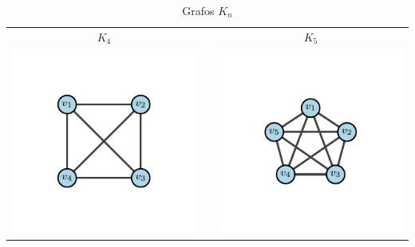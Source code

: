 \begin{table}[h!]
\begin{center}
\begin{tabular}{ccc}
                    \\
                    \textbf{$K_4$} &  & \textbf{$K_5$} \\
                    \includegraphics{Sections/Graphs/GraphsImages/GraphsKn/K4.pdf}
                    &
                    &
                    \includegraphics{Sections/Graphs/GraphsImages/GraphsKn/K5.pdf}
                \end{tabular}
              \caption{Grafos $K_n$}
              \label{tbl:grafosKn}
            \end{center}
        \end{table}

